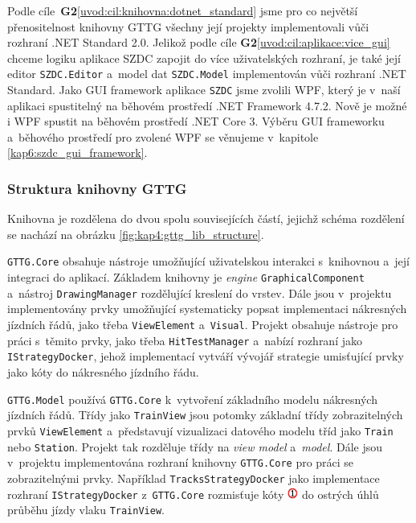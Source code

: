 Podle cíle~\textbf{\color{goalcolor}G2}\ref{uvod:cil:knihovna:dotnet_standard} jsme pro co největší přenositelnost knihovny GTTG všechny její projekty  implementovali vůči rozhraní .NET Standard 2.0. Jelikož podle cíle \textbf{\color{goalcolor}G2}\ref{uvod:cil:aplikace:vice_gui} chceme logiku aplikace SZDC zapojit do více uživatelských rozhraní, je také její editor \texttt{SZDC.Editor} a~model dat \texttt{SZDC.Model} implementován vůči rozhraní .NET Standard. Jako GUI framework aplikace \texttt{SZDC} jsme zvolili WPF, který je v~naší aplikaci spustitelný na běhovém prostředí .NET Framework 4.7.2. Nově je možné i WPF spustit na běhovém prostředí .NET Core 3. Výběru GUI frameworku a~běhového prostředí pro zvolené WPF se věnujeme v~kapitole \ref{kap6:szdc_gui_framework}.

\subsubsection*{Struktura knihovny GTTG}
Knihovna je rozdělena do dvou spolu souvisejících částí, jejichž schéma rozdělení se nachází na obrázku \ref{fig:kap4:gttg_lib_structure}.

\texttt{GTTG.Core} obsahuje nástroje umožňující uživatelskou interakci s~knihovnou a~její integraci do aplikací. Základem knihovny je \textit{engine} \texttt{GraphicalComponent} a~nástroj \texttt{DrawingManager} rozdělující kreslení do vrstev. Dále jsou v~projektu implementovány prvky umožňující systematicky popsat implementaci nákresných jízdních řádů, jako třeba \texttt{ViewElement} a~\texttt{Visual}. 
Projekt obsahuje nástroje pro práci s~těmito prvky, jako třeba \texttt{HitTestManager} a~nabízí rozhraní jako \linebreak\texttt{IStrategyDocker}, jehož implementací vytváří vývojář strategie umisťující prvky jako kóty do nákresného jízdního řádu.

\texttt{GTTG.Model} používá \texttt{GTTG.Core} k~vytvoření základního modelu nákresných jízdních řádů. Třídy jako \texttt{TrainView} jsou potomky základní třídy zobrazitelných prvků \texttt{ViewElement} a~představují vizualizaci datového modelu tříd jako \texttt{Train} nebo \texttt{Station}. Projekt tak rozděluje třídy na \textit{view model} a~\textit{model}. Dále jsou v~projektu implementována rozhraní knihovny \texttt{GTTG.Core} pro práci se zobrazitelnými prvky. Například \texttt{TracksStrategyDocker} jako implementace rozhraní \texttt{IStrategyDocker} z~\texttt{GTTG.Core} rozmisťuje kóty \includegraphics[height=10.0pt]{../img/cas_osa_typ_1} do ostrých úhlů průběhu jízdy vlaku \texttt{TrainView}.

